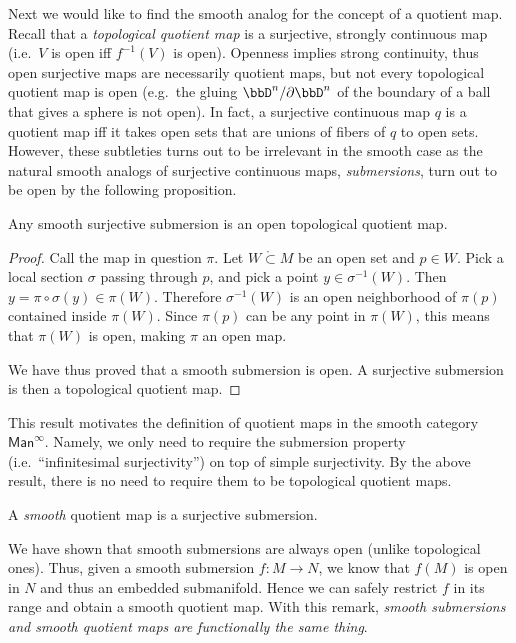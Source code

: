     Next we would like to find the smooth analog for the concept of a quotient map. Recall that a \emph{topological quotient map} is a surjective, strongly continuous map (i.e.\ $V$ is open iff $f^{-1}(V)$ is open). Openness implies strong continuity, thus open surjective maps are necessarily quotient maps, but not every topological quotient map is open (e.g.\ the gluing $\bbD^n\slash \partial \bbD^n$ of the boundary of a ball that gives a sphere is not open). In fact, a surjective continuous map $q$ is a quotient map iff it takes open sets that are unions of fibers of $q$ to open sets. However, these subtleties turns out to be irrelevant in the smooth case as the natural smooth analogs of surjective continuous maps, \emph{submersions}, turn out to be open by the following proposition.
    
    \begin{prop}\label{thm submersions are open quotient maps}
    Any smooth surjective submersion is an open topological quotient map.
    \end{prop}
\begin{proof}
Call the map in question $\pi$. Let $W\mathring{\subset} M$ be an open set and $p\in W$. Pick a local section $\sigma $ passing through $p$, and pick a point $y\in \sigma^{-1}(W)$. Then $y=\pi\circ\sigma(y)\in\pi(W)$. Therefore $\sigma^{-1}(W)$ is an open neighborhood of $\pi(p)$ contained inside $\pi(W)$. Since $\pi(p)$ can be any point in $\pi(W)$, this means that $\pi(W)$ is open, making $\pi$ an open map.

We have thus proved that a smooth submersion is open. A surjective submersion is then a topological quotient map.
\end{proof}

This result motivates the definition of quotient maps in the smooth category $\mathsf{Man}^\infty$. Namely, we only need to require the submersion property (i.e.\ ``infinitesimal surjectivity'') on top of simple surjectivity. By the above result, there is no need to require them to be topological quotient maps.

\begin{defn}
A \emph{smooth} quotient map is a surjective submersion.
\end{defn}

We have shown that smooth submersions are always open (unlike topological ones). Thus, given a smooth submersion $f:M\to N$, we know that $f(M)$ is open in $N$ and thus an embedded submanifold. Hence we can safely restrict $f$ in its range and obtain a smooth quotient map. With this remark, \emph{smooth submersions and smooth quotient maps are functionally the same thing}.

